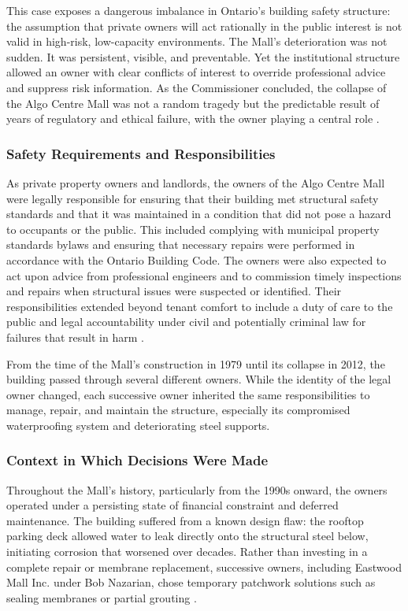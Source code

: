 \documentclass[12pt]{article}
\begin{document}
This case exposes a dangerous imbalance in Ontario's building safety structure: the assumption that private owners will act rationally in the public interest is not valid in high-risk, low-capacity environments. The Mall's deterioration was not sudden. It was persistent, visible, and preventable. Yet the institutional structure allowed an owner with clear conflicts of interest to override professional advice and suppress risk information. As the Commissioner concluded, the collapse of the Algo Centre Mall was not a random tragedy but the predictable result of years of regulatory and ethical failure, with the owner playing a central role \cite[p6-7, p243-248]{AlgoLakeReport1}.

\subsubsection*{Safety Requirements and Responsibilities}

As private property owners and landlords, the owners of the Algo Centre Mall were legally responsible for ensuring that their building met structural safety standards and that it was maintained in a condition that did not pose a hazard to occupants or the public. This included complying with municipal property standards bylaws and ensuring that necessary repairs were performed in accordance with the Ontario Building Code. The owners were also expected to act upon advice from professional engineers and to commission timely inspections and repairs when structural issues were suspected or identified. Their responsibilities extended beyond tenant comfort to include a duty of care to the public and legal accountability under civil and potentially criminal law for failures that result in harm \cite[p160-161, p171-172]{AlgoLakeReport1}.

From the time of the Mall's construction in 1979 until its collapse in 2012, the building passed through several different owners. While the identity of the legal owner changed, each successive owner inherited the same responsibilities to manage, repair, and maintain the structure, especially its compromised waterproofing system and deteriorating steel supports.

\subsubsection*{Context in Which Decisions Were Made}

Throughout the Mall's history, particularly from the 1990s onward, the owners operated under a persisting state of financial constraint and deferred maintenance. The building suffered from a known design flaw: the rooftop parking deck allowed water to leak directly onto the structural steel below, initiating corrosion that worsened over decades. Rather than investing in a complete repair or membrane replacement, successive owners, including Eastwood Mall Inc. under Bob Nazarian, chose temporary patchwork solutions such as sealing membranes or partial grouting \cite[p183-185, 243-245]{AlgoLakeReport1}.
\end{document}
